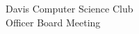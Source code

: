 \documentclass{article}
\begin{document}
\begin{Minutes}{Davis Computer Science Club\\Officer Board Meeting}
\end{Minutes}
\thispagestyle{creditfooter}
\end{document}
